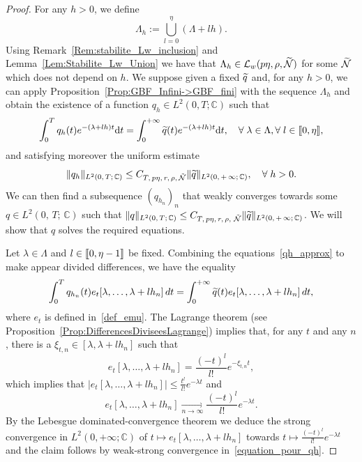 \documentclass[10pt]{amsart}
\theoremstyle{definition}\newtheorem{defi}[theo]{Definition}\newtheorem{rema}[theo]{Remark}\newtheorem{exam}[theo]{Example}\newtheorem{exem}[theo]{Example}\newtheorem{nota}[theo]{Notation}
\newcommand{\llbracket}{\mathopen{[\mkern -2.7mu[}}
\newcommand{\rrbracket}{\mathclose{]\mkern -2.7mu]}}
\newcommand{\inter}[2]{\llbracket #1,#2 \rrbracket}
\newcommand{\LL}{\mathcal{L}}
\newcommand{\NN}{\mathcal{N}}
\newcommand{\C}{\mathbb{C}}
\newcommand{\md}{\mathrm{d}}
\let\oldtilde\tilde
\renewcommand*{\tilde}[1]{\mathchoice{\widetilde{#1}}{\widetilde{#1}}{\oldtilde{#1}}{\oldtilde{#1}}}\let\oldexists\exists
\renewcommand*{\exists}{\mathrel{\oldexists}}
\let\oldforall\forall
\renewcommand*{\forall}{\mathrel{\oldforall}}
\begin{document}
\begin{proof}
For any $h>0$, we define
\[
\Lambda_h:=\bigcup_{l=0}^{\eta} (\Lambda + l h).
\]
Using Remark~\ref{Rem:stabilite_Lw_inclusion} and Lemma~\ref{Lem:Stabilite_Lw_Union} we have that $\Lambda_h\in \LL_w(p\eta, \rho, \tilde{\NN})$ for some $\tilde{\NN}$ which does not depend on $h$. We suppose given a fixed $\tilde{q}$ and, for any $h>0$, we can apply Proposition~\ref{Prop:GBF_Infini->GBF_fini} with the sequence $\Lambda_h$ and obtain the existence of a function $q_h\in L^2(0,T;\C)$ such that
\begin{equation}\label{qh_approx}
\int_0^T q_h(t) e^{-(\lambda + lh) t} \md t = \int_0^{+\infty} \tilde{q}(t) e^{-(\lambda + lh) t} \md t, \quad\forall \lambda\in \Lambda, \forall l\in \inter{0}{\eta},
\end{equation}
and satisfying moreover the uniform estimate
\[
\|q_h\|_{L^2(0,\,T;\,\C)} \leq C_{T,\,p\eta,\,r,\,\rho, \,\tilde{\NN}} \|\tilde{q}\|_{L^2(0,\,+\,\infty;\,\C)}, \quad \forall h>0.
\]
We can then find a subsequence $(q_{h_n})_n$ that weakly converges towards some $q\in L^2(0,\,T;\,\C)$ such that $\|q\|_{L^2(0,\,T;\,\C)} \leq C_{T,\,p\eta,\,r,\,\rho,\, \,\tilde{\NN}} \|\tilde{q}\|_{L^2(0,\,+\,\infty;\,\C)}$. We will show that $q$ solves the required equations.

Let $\lambda\in \Lambda$ and $l\in \inter{0}{\eta-1}$ be fixed. Combining the equations~\eqref{qh_approx} to make appear divided differences, we have the equality
\begin{equation}\label{equation_pour_qh}
\int_0^{T} q_{h_n}(t) e_t[\lambda,\dotsc,\lambda+lh_n] \, dt = \int_0^{+\infty} \tilde{q}(t) e_t[\lambda,\dotsc,\lambda+l h_n] \, dt,
\end{equation}
where $e_t$ is defined in~\eqref{def_emu}. The Lagrange theorem (see Proposition~\ref{Prop:DifferencesDiviseesLagrange}) implies that, for any $t$ and any $n$, there is a $\xi_{t,n}\in [\lambda,\lambda+lh_n]$ such that
\[
e_t[\lambda,\dotsc,\lambda+lh_n] = \frac{(-t)^l}{l!} e^{-\xi_{t,n} t},
\]
which implies that $| e_t[\lambda,\dotsc,\lambda+lh_n]|\leq \frac{t^l}{l!} e^{-\lambda t}$ and
\[
e_t[\lambda,\dotsc,\lambda+lh_n]\xrightarrow[n\to \infty]{} \frac{(-t)^l}{l!} e^{-\lambda t}.
\]
By the Lebesgue dominated-convergence theorem we deduce the strong convergence in $L^2(0,+\infty;\C)$ of $t\mapsto e_t[\lambda,\dotsc,\lambda+lh_n]$ towards $t\mapsto \frac{(-t)^l}{l!} e^{-\lambda t}$ and the claim follows by weak-strong convergence in~\eqref{equation_pour_qh}.
\end{proof}
\end{document}
